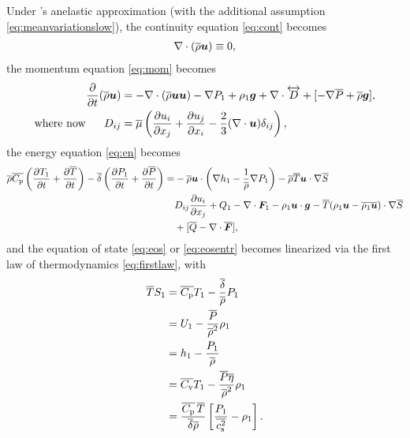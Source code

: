 \documentclass[12pt]{article}
\newcommand{\vecf}{\bm{F}}
\begin{document}
	Under \citet{Gough1969}'s anelastic approximation (with the additional assumption \eqref{eq:meanvariationslow}), the continuity equation \eqref{eq:cont} becomes
	\begin{align}\label{eq:ancont}
		\nabla\cdot(\overline{\rho}\bm{u})\equiv 0,
	\end{align}
	the momentum equation \eqref{eq:mom} becomes 
	\begin{subequations}\label{eq:anmom}
	\begin{align}
		\frac{\partial}{\partial t}(\overline{\rho}\bm{u})&=-\nabla\cdot(\overline{\rho}\bm{u}\bm{u}) - \nabla P_1 +\rho_1\bm{g} +\nabla\cdot \overleftrightarrow{D}+[-\nabla\overline{P} + \overline{\rho}\bm{g}],\label{eq:anmommain}\\
		\text{where now}\ \ \ \ \  D_{ij}& = \overline{\mu}\left(\frac{\partial u_i}{\partial x_j} + \frac{\partial u_j}{\partial x_i} - \frac{2}{3}(\nabla\cdot\bm{u})\delta_{ij}\right)\label{eq:anmomvisc},
	\end{align}
	\end{subequations}
	the energy equation \eqref{eq:en} becomes 
	\begin{align}\label{eq:anen}
		\rhoover\cpover\left(\pderiv{\tmpone}{t}+\pderiv{\tmpover}{t}\right)- \deltaover\left(\pderiv{\prsone}{t} + \pderiv{\prsover}{t}\right) = &-\rhoover\vecu\cdot\left(\nabla \enthone-\frac{1}{\rhoover}\nabla \prsone\right) - \rhoover \tmpover \ugrad \entrover\nonumber\\
		& D_{ij}\pderiv{u_i}{x_j} + Q _1- \Div\vecf_1 -\rhoone\vecu\cdot\vecg - \tmpover(\rhoone\vecu-\overline{\rhoone\vecu})\cdot\nabla\entrover\nonumber\\
		&+ [\heatover - \Div\overline{\vecf}],
	\end{align}
  and the equation of state \eqref{eq:eos} or \eqref{eq:eosentr} becomes linearized via the first law of thermodynamics \eqref{eq:firstlaw}, with
  \begin{subequations}\label{eq:anfirstlawpert}
  \begin{align}
  	\overline{T} S_1 &= \overline{C_{\rm{p}}} T_1 - \frac{\overline{\delta}}{\overline{\rho}} P_1\label{eq:anfirstlawperttmpprs}\\
  	&= U_1 - \frac{\overline{P}}{\overline{\rho}^2}\rho_1 \label{eq:anfirstlawpertinterho}\\
  	&= h_1 - \frac{P_1}{\overline{\rho}}\label{eq:anfirstlawwpthprs}\\
  	&= \overline{C_{\rm{v}}} T_1 - \frac{\overline{P}\overline{\eta}}{\overline{\rho}^2}\rho_1\label{eq:anfirstlawperttmprho}\\		
  	&= \frac{\overline{C_{\rm{p}}}\, \overline{T}}{\overline{\delta}\overline{\rho}}\left[\frac{P_1}{\overline{c_{\rm s}^2}}-\rho_1\right].\label{eq:anfirstlawpertprsrho}
  \end{align}
  \end{subequations}
\end{document}
